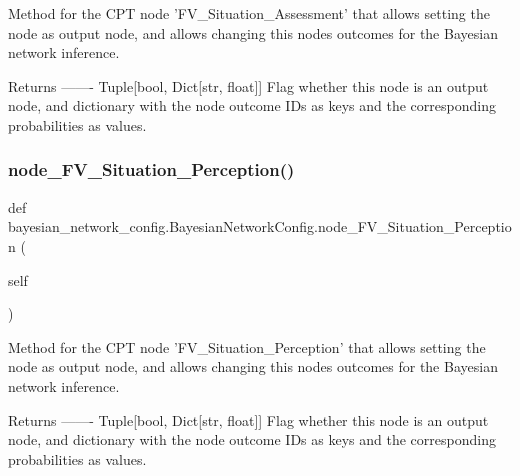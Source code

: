 \begin{DoxyVerb}Method for the CPT node 'FV_Situation_Assessment' that allows setting the node as output node,
and allows changing this nodes outcomes for the Bayesian network inference.

Returns
-------
Tuple[bool, Dict[str, float]]
    Flag whether this node is an output node, and dictionary with the node outcome IDs as keys
    and the corresponding probabilities as values.
\end{DoxyVerb}
 \mbox{\label{classbayesian__network__config_1_1_bayesian_network_config_aa4e512eed678233616fbc648e8a5d973}} 
\subsubsection{\texorpdfstring{node\+\_\+\+F\+V\+\_\+\+Situation\+\_\+\+Perception()}{node\_FV\_Situation\_Perception()}}
{\footnotesize\ttfamily def bayesian\+\_\+network\+\_\+config.\+Bayesian\+Network\+Config.\+node\+\_\+\+F\+V\+\_\+\+Situation\+\_\+\+Perception (\begin{DoxyParamCaption}\item[{}]{self }\end{DoxyParamCaption})}

\begin{DoxyVerb}Method for the CPT node 'FV_Situation_Perception' that allows setting the node as output node,
and allows changing this nodes outcomes for the Bayesian network inference.

Returns
-------
Tuple[bool, Dict[str, float]]
    Flag whether this node is an output node, and dictionary with the node outcome IDs as keys
    and the corresponding probabilities as values.
\end{DoxyVerb}
 \mbox{\label{classbayesian__network__config_1_1_bayesian_network_config_a7f212c99308978eef668419727075a07}} 
